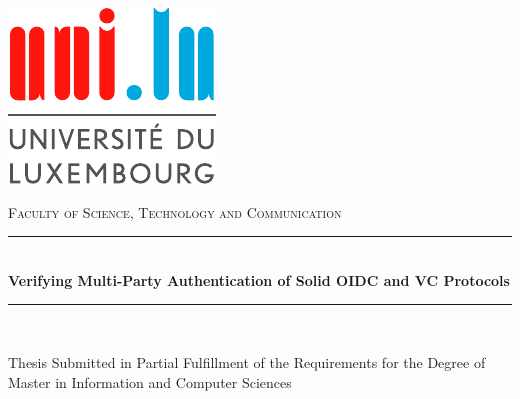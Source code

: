 \newcommand{\HRule}{\rule{\linewidth}{0.5mm}}

\begin{titlepage}

\begin{center}

\includegraphics{frontmatter/unilogo}

\vspace{1cm}

\textsc{\Large Faculty of Science, Technology and Communication}\\[1.0cm]

\vspace{1cm}

\HRule \\[0.4cm]
{\huge \bfseries Verifying Multi-Party Authentication of Solid OIDC and VC Protocols}\\
\HRule \\[1.5cm]


\begin{minipage}{0.8\textwidth}
\begin{center}
{\Large Thesis Submitted in Partial Fulfillment of the Requirements
for the Degree of Master in Information and Computer Sciences}
\end{center}
\end{minipage}


\end{center}
\end{titlepage}
